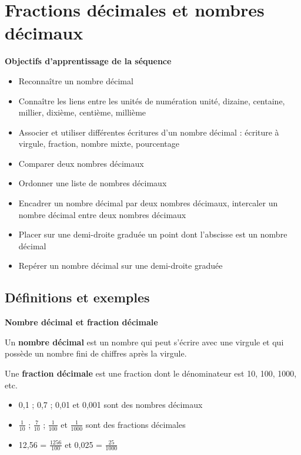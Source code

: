 \chapter{Fractions décimales et nombres décimaux}

\begin{objectifsbox}
	\textbf{Objectifs d'apprentissage de la séquence}
	\begin{itemize}
		\item Reconnaître un nombre décimal
		\item Connaître les liens entre les unités de numération unité, dizaine, centaine, millier, dixième, centième, millième
		\item Associer et utiliser différentes écritures d'un nombre décimal : écriture à virgule, fraction, nombre mixte, pourcentage
		\item Comparer deux nombres décimaux
		\item Ordonner une liste de nombres décimaux
		\item Encadrer un nombre décimal par deux nombres décimaux, intercaler un nombre décimal entre deux nombres décimaux
		\item Placer sur une demi-droite graduée un point dont l'abscisse est un nombre décimal
		\item Repérer un nombre décimal sur une demi-droite graduée
	\end{itemize}
\end{objectifsbox}

\section{Définitions et exemples}

\begin{definitionbox}
	\textbf{Nombre décimal et fraction décimale}
	
	Un \textbf{nombre décimal} est un nombre qui peut s'écrire avec une virgule et qui possède un nombre fini de chiffres après la virgule.
	
	Une \textbf{fraction décimale} est une fraction dont le dénominateur est 10, 100, 1000, etc.
\end{definitionbox}

\begin{examplebox}
	\begin{itemize}
		\item 0,1 ; 0,7 ; 0,01 et 0,001 sont des nombres décimaux
		\item $\frac{1}{10}$ ; $\frac{7}{10}$ ; $\frac{1}{100}$ et $\frac{1}{1000}$ sont des fractions décimales
		\item 12,56 = $\frac{1256}{100}$ et 0,025 = $\frac{25}{1000}$
	\end{itemize}
\end{examplebox}

